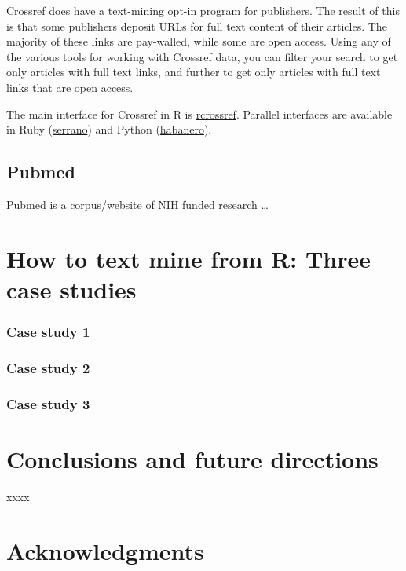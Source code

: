 \documentclass[author-year, review, 11pt]{components/elsarticle} %
\begin{document}
Crossref does have a text-mining opt-in program for publishers. The
result of this is that some publishers deposit URLs for full text
content of their articles. The majority of these links are pay-walled,
while some are open access. Using any of the various tools for working
with Crossref data, you can filter your search to get only articles with
full text links, and further to get only articles with full text links
that are open access.

The main interface for Crossref in R is
\href{https://github.com/ropensci/rcrossref}{rcrossref}. Parallel
interfaces are available in Ruby
(\href{https://github.com/sckott/serrano}{serrano}) and Python
(\href{https://github.com/sckott/habanero}{habanero}).

\subsection{Pubmed}\label{pubmed}

Pubmed is a corpus/website of NIH funded research \ldots{}

\section{How to text mine from R: Three case
studies}\label{how-to-text-mine-from-r-three-case-studies}

\subsubsection{Case study 1}\label{case-study-1}

\subsubsection{Case study 2}\label{case-study-2}

\subsubsection{Case study 3}\label{case-study-3}

\section{Conclusions and future
directions}\label{conclusions-and-future-directions}

xxxx

\section{Acknowledgments}\label{acknowledgments}
\end{document}
